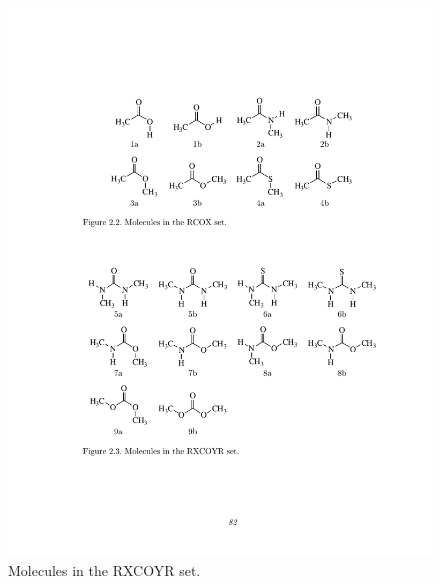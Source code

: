 \documentclass[12pt]{report}
\begin{document}
\begin{figure}[hb]
\centering
\includegraphics[scale=0.87]{figures/pdf/rxcoyrset.pdf}
\caption{Molecules in the RXCOYR set.}
\label{rxcoyr}
\end{figure}
\end{document}

